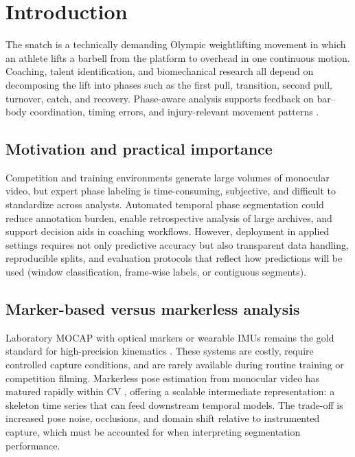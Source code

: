 \section{Introduction}
\label{sec:introduction}

The snatch is a technically demanding Olympic weightlifting movement in which an athlete lifts a barbell from the platform to overhead in one continuous motion.
Coaching, talent identification, and biomechanical research all depend on decomposing the lift into phases such as the first pull, transition, second pull, turnover, catch, and recovery.
Phase-aware analysis supports feedback on bar--body coordination, timing errors, and injury-relevant movement patterns .

\subsection{Motivation and practical importance}

Competition and training environments generate large volumes of monocular video, but expert phase labeling is time-consuming, subjective, and difficult to standardize across analysts.
Automated temporal phase segmentation could reduce annotation burden, enable retrospective analysis of large archives, and support decision aids in coaching workflows.
However, deployment in applied settings requires not only predictive accuracy but also transparent data handling, reproducible splits, and evaluation protocols that reflect how predictions will be used (window classification, frame-wise labels, or contiguous segments).

\subsection{Marker-based versus markerless analysis}

Laboratory \acs{MOCAP} with optical markers or wearable \acs{IMU}s remains the gold standard for high-precision kinematics .
These systems are costly, require controlled capture conditions, and are rarely available during routine training or competition filming.
Markerless pose estimation from monocular video has matured rapidly within \acs{CV} , offering a scalable intermediate representation: a skeleton time series that can feed downstream temporal models.
The trade-off is increased pose noise, occlusions, and domain shift relative to instrumented capture, which must be accounted for when interpreting segmentation performance.

